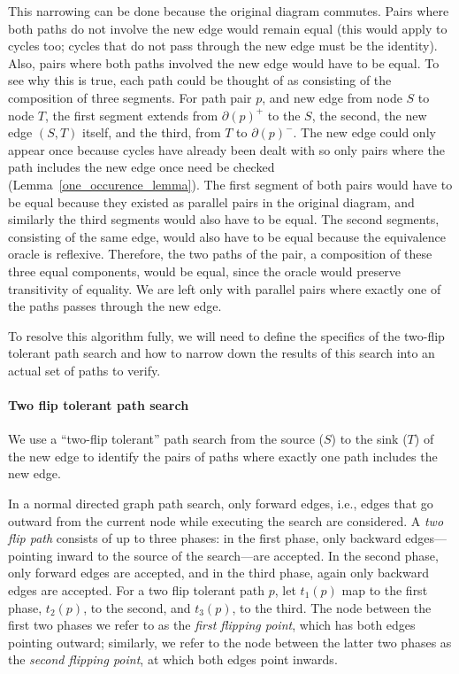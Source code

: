 \documentclass[sigplan,review]{acmart}
\begin{document}
This narrowing can be done because the original diagram commutes.
Pairs where both paths do not involve the new edge would remain equal (this would apply to cycles too; cycles that do not pass through the new edge must be the identity).
Also, pairs where both paths involved the new edge would have to be equal.
To see why this is true, each path could be thought of as consisting of the composition of three segments.
For path pair $p$, and new edge from node $S$ to node $T$, the first segment extends from $\partial(p)^+$ to the $S$, the second, the new edge $(S, T)$ itself, and the third, from $T$ to $\partial(p)^-$.
The new edge could only appear once because cycles have already been dealt with so only pairs where the path includes the new edge once need be checked (Lemma~\ref{one_occurence_lemma}).
The first segment of both pairs would have to be equal because they existed as parallel pairs in the original diagram, and similarly the third segments would also have to be equal.
The second segments, consisting of the same edge, would also have to be equal because the equivalence oracle is reflexive.
Therefore, the two paths of the pair, a composition of these three equal components, would be equal, since the oracle would preserve transitivity of equality.
We are left only with parallel pairs where exactly one of the paths passes through the new edge.

To resolve this algorithm fully, we will need to define the specifics of the two-flip tolerant path search and how to narrow down the results of this search into an actual set of paths to verify.

\paragraph{Two flip tolerant path search}
We use a ``two-flip tolerant'' path search from the source ($S$) to the sink ($T$) of the new edge to identify the pairs of paths where exactly one path includes the new edge.

In a normal directed graph path search, only forward edges, i.e., edges that go outward from the current node while executing the search are considered.
A \textit{two flip path} consists of up to three phases: in the first phase, only backward edges---pointing inward to the source of the search---are accepted.
In the second phase, only forward edges are accepted, and in the third phase, again only backward edges are accepted.
For a two flip tolerant path $p$, let $t_1(p)$ map to the first phase, $t_2(p)$, to the second, and $t_3(p)$, to the third.
The node between the first two phases we refer to as the \textit{first flipping point}, which has both edges pointing outward; similarly, we refer to the node between the latter two phases as the \textit{second flipping point}, at which both edges point inwards.
\end{document}
